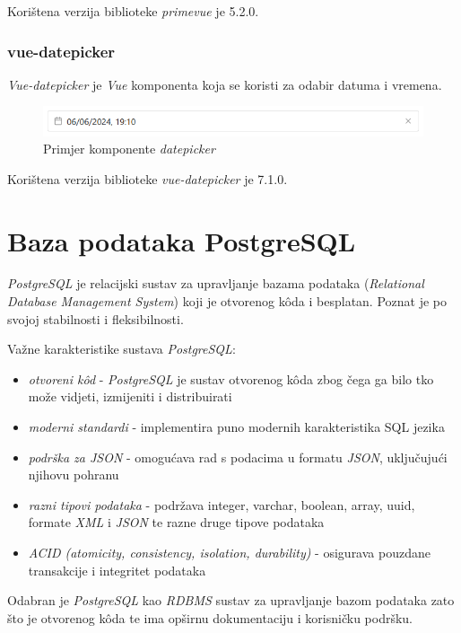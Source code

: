 \documentclass[zavrsnirad]{fer}
\begin{document}
Korištena verzija biblioteke \textit{primevue} je 5.2.0.

\subsubsection{vue-datepicker}
\textit{Vue-datepicker} je \textit{Vue} komponenta koja se koristi za odabir datuma i vremena.
\begin{figure}[htb]
	\centering
	\includegraphics[width=1\linewidth]{images/datepicker_example.png} 
	\caption{Primjer komponente \textit{datepicker}}
	\label{slk:datepicker_example}
\end{figure}
\FloatBarrier

Korištena verzija biblioteke \textit{vue-datepicker} je 7.1.0.

\section{Baza podataka PostgreSQL}
\label{pog:postgresql}
\textit{PostgreSQL} je relacijski sustav za upravljanje bazama podataka (\textit{Relational Database Management System}) koji je otvorenog kôda i besplatan. Poznat je po svojoj stabilnosti i fleksibilnosti.

Važne karakteristike sustava \textit{PostgreSQL}:
\begin{itemize}
	\item \textit{otvoreni kôd} - \textit{PostgreSQL} je sustav otvorenog kôda zbog čega ga bilo tko može vidjeti, izmijeniti i distribuirati
	\item \textit{moderni standardi} - implementira puno modernih karakteristika SQL jezika
	\item \textit{podrška za JSON} - omogućava rad s podacima u formatu \textit{JSON}, uključujući njihovu pohranu
	\item \textit{razni tipovi podataka} - podržava integer, varchar, boolean, array, uuid, formate \textit{XML} i \textit{JSON} te razne druge tipove podataka
	\item \textit{ACID (atomicity, consistency, isolation, durability)} - osigurava pouzdane transakcije i integritet podataka
\end{itemize}

Odabran je \textit{PostgreSQL} kao \textit{RDBMS} sustav za upravljanje bazom podataka zato što je otvorenog kôda te ima opširnu dokumentaciju i korisničku podršku.
\end{document}
